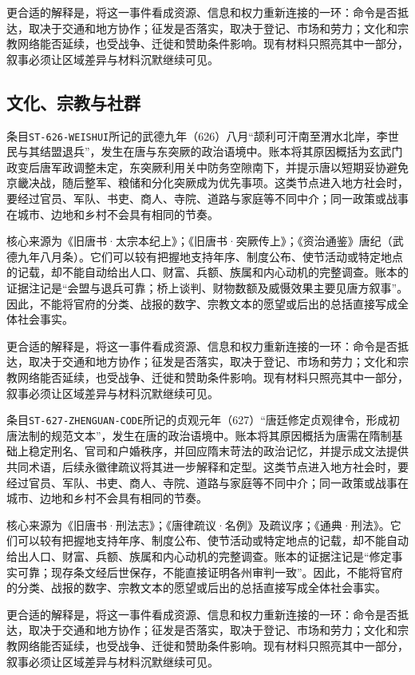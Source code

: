更合适的解释是，将这一事件看成资源、信息和权力重新连接的一环：命令是否抵达，取决于交通和地方协作；征发是否落实，取决于登记、市场和劳力；文化和宗教网络能否延续，也受战争、迁徙和赞助条件影响。现有材料只照亮其中一部分，叙事必须让区域差异与材料沉默继续可见。

\subsection{文化、宗教与社群}

条目\texttt{ST-626-WEISHUI}所记的武德九年（626）八月“颉利可汗南至渭水北岸，李世民与其结盟退兵”，发生在唐与东突厥的政治语境中。账本将其原因概括为玄武门政变后唐军政调整未定，东突厥利用关中防务空隙南下，并提示唐以短期妥协避免京畿决战，随后整军、粮储和分化突厥成为优先事项。这类节点进入地方社会时，要经过官员、军队、书吏、商人、寺院、道路与家庭等不同中介；同一政策或战事在城市、边地和乡村不会具有相同的节奏。

核心来源为《旧唐书·太宗本纪上》；《旧唐书·突厥传上》；《资治通鉴》唐纪（武德九年八月条）。它们可以较有把握地支持年序、制度公布、使节活动或特定地点的记载，却不能自动给出人口、财富、兵额、族属和内心动机的完整调查。账本的证据注记是“会盟与退兵可靠；桥上谈判、财物数额及威慑效果主要见唐方叙事”。因此，不能将官府的分类、战报的数字、宗教文本的愿望或后出的总括直接写成全体社会事实。

更合适的解释是，将这一事件看成资源、信息和权力重新连接的一环：命令是否抵达，取决于交通和地方协作；征发是否落实，取决于登记、市场和劳力；文化和宗教网络能否延续，也受战争、迁徙和赞助条件影响。现有材料只照亮其中一部分，叙事必须让区域差异与材料沉默继续可见。

条目\texttt{ST-627-ZHENGUAN-CODE}所记的贞观元年（627）“唐廷修定贞观律令，形成初唐法制的规范文本”，发生在唐的政治语境中。账本将其原因概括为唐需在隋制基础上稳定刑名、官司和户婚秩序，并回应隋末苛法的政治记忆，并提示成文法提供共同术语，后续永徽律疏议将其进一步解释和定型。这类节点进入地方社会时，要经过官员、军队、书吏、商人、寺院、道路与家庭等不同中介；同一政策或战事在城市、边地和乡村不会具有相同的节奏。

核心来源为《旧唐书·刑法志》；《唐律疏议·名例》及疏议序；《通典·刑法》。它们可以较有把握地支持年序、制度公布、使节活动或特定地点的记载，却不能自动给出人口、财富、兵额、族属和内心动机的完整调查。账本的证据注记是“修定事实可靠；现存条文经后世保存，不能直接证明各州审判一致”。因此，不能将官府的分类、战报的数字、宗教文本的愿望或后出的总括直接写成全体社会事实。

更合适的解释是，将这一事件看成资源、信息和权力重新连接的一环：命令是否抵达，取决于交通和地方协作；征发是否落实，取决于登记、市场和劳力；文化和宗教网络能否延续，也受战争、迁徙和赞助条件影响。现有材料只照亮其中一部分，叙事必须让区域差异与材料沉默继续可见。

